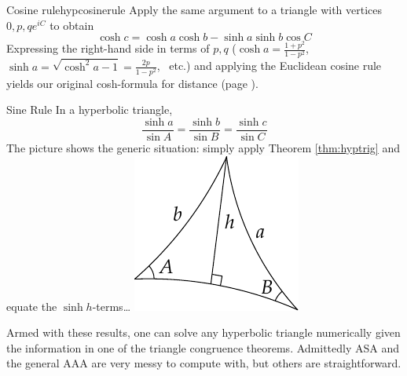 \begin{cor}{Cosine rule}{hypcosinerule}
Apply the same argument to a triangle with vertices $0,p,qe^{iC}$ to obtain
\[\cosh c=\cosh a\cosh b-\sinh a\sinh b\cos C\]
Expressing the right-hand side in terms of $p,q$ ($\cosh a=\frac{1+p^2}{1-p^2}$, $\sinh a=\sqrt{\cosh^2\!a-1}=\frac{2p}{1-p^2}$, \ etc.) and applying the Euclidean cosine rule yields our original cosh-formula for distance (page \pageref{lemm:distformula}).
\end{cor}


\begin{cor}[lower separated=false, sidebyside, sidebyside align=top seam, sidebyside gap=0pt, righthand width=0.25\linewidth]{Sine Rule}{}
In a hyperbolic triangle,
\[\frac{\sinh a}{\sin A}=\frac{\sinh b}{\sin B}=\frac{\sinh c}{\sin C}\]
The picture shows the generic situation: simply apply Theorem \ref{thm:hyptrig} and equate the $\sinh h$-terms\ldots
\tcblower
\flushright\includegraphics{isom-sine}
\end{cor}

Armed with these results, one can solve any hyperbolic triangle numerically given the information in one of the triangle congruence theorems. Admittedly ASA and the general AAA are very messy to compute with, but others are straightforward.


